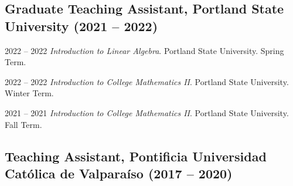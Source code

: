 \documentclass[12pt,letterpaper]{report}
\begin{document}
    \subsection*{Graduate Teaching Assistant, Portland State University (2021 -- 2022)}

    \begin{tablist}

        \item[2022 -- 2022] \tab \emph{Introduction to Linear Algebra}. Portland State University. Spring Term.

        \item[2022 -- 2022] \tab \emph{Introduction to College Mathematics II}. Portland State University. Winter Term.

        \item[2021 -- 2021] \tab \emph{Introduction to College Mathematics II}. Portland State University. Fall Term. 
    
    \end{tablist}

    \subsection*{Teaching Assistant, Pontificia Universidad Cat\'olica de Valpara\'iso (2017 -- 2020)}
\end{document}
